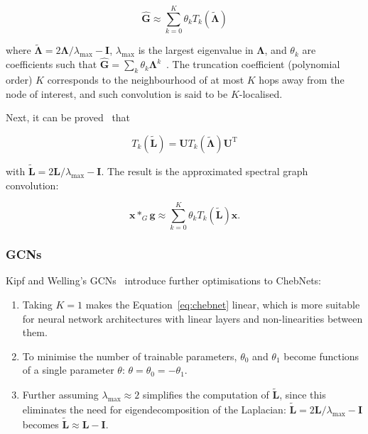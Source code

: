\begin{equation}
    \mathbf{\hat{G}} \approx \sum_{k = 0}^{K} \theta_k T_k(\mathbf{\tilde{\Lambda}})
\end{equation}

where $\mathbf{\tilde{\Lambda}} = 2\mathbf{\Lambda}/\lambda_{\mathrm{max}} - \mathbf{I}$, $\lambda_\mathrm{max}$ is the largest eigenvalue in $\mathbf{\Lambda}$, and $\theta_k$ are coefficients such that $\mathbf{\hat{G}} = \sum_k \theta_k \mathbf{\Lambda}^k$~\cite{wu2019simplifying}. The truncation coefficient (polynomial order) $K$ corresponds to the neighbourhood of at most $K$ hops away from the node of interest, and such convolution is said to be $K$-localised. 

Next, it can be proved~\cite{wu2019comprehensive} that

\begin{equation}
    T_k(\mathbf{\tilde{L}}) = \mathbf{U}T_k(\mathbf{\tilde{\Lambda}})\mathbf{U}^{\mathrm{T}}
\end{equation}

with $\mathbf{\tilde{L}} = 2\mathbf{L}/\lambda_{\mathrm{max}} - \mathbf{I}$. The result is the approximated spectral graph convolution:

\begin{equation}
    \label{eq:chebnet}
    \mathbf{x} *_G \mathbf{g} \approx \sum_{k=0}^{K}\theta_k T_k(\mathbf{\tilde{L}})\mathbf{x}.
\end{equation}


\subsubsection{GCNs}
Kipf and Welling's GCNs~\cite{kipf2017semi} introduce further optimisations to ChebNets: 
\begin{enumerate}
    \item Taking $K=1$ makes the Equation~\eqref{eq:chebnet} linear, which is more suitable for neural network architectures with linear layers and non-linearities between them.
    \item To minimise the number of trainable parameters, $\theta_0$ and $\theta_1$ become functions of a single parameter $\theta$: $\theta = \theta_0 = -\theta_1$.
    \item Further assuming $\lambda_{\mathrm{max}}\approx 2$ simplifies the computation of $\mathbf{\tilde{L}}$, since this eliminates the need for eigendecomposition of the Laplacian: $\mathbf{\tilde{L}} = 2\mathbf{L}/\lambda_{\mathrm{max}} - \mathbf{I}$ becomes $\mathbf{\tilde{L}} \approx \mathbf{L} - \mathbf{I}$.
\end{enumerate}

